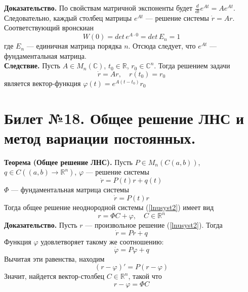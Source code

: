 \documentclass{article}
\begin{document}
\noindent \textbf{Доказательство.} По свойствам матричной экспоненты будет $\frac{d}{dt}e^{At} = Ae^{At}$. Следовательно, каждый столбец матрицы $e^{At}$ --- решение системы $\dot{r} = Ar$. Соответствующий вронскиан
\begin{equation*}
    W(0) = det\, e^{A\cdot 0} = det\, E_n = 1
\end{equation*}
где $E_n$ --- единичная матрица порядка $n$. Отсюда следует, что $e^{At}$ --- фундаментальная матрица.\\

\noindent \textbf{Следствие.} Пусть $A \in M_n(\mathbb{C})$, $t_0 \in \mathbb{R}$, $r_0 \in \mathbb{C}^n$. Тогда решением задачи
\begin{equation*}
    \dot{r} = Ar, \quad r(t_0) = r_0
\end{equation*}
является вектор-функция $\varphi(t) = e^{A(t - t_0)}r_0$

\section{Билет №18. Общее решение ЛНС и метод вариации постоянных.}
\textbf{Теорема (Общее решение ЛНС).} Пусть $P \in M_n(C(a,b))$, $q \in C((a,b) \to \mathbb{R}^n)$, $\varphi$ --- решение системы
\begin{equation}
    \dot{r} = P(t)r + q(t) \label{lnusyst2}
\end{equation}
$\Phi$ --- фундаментальная матрица системы
\begin{equation*}
    \dot{r} = P(t)r
\end{equation*}
Тогда общее решение неоднородной системы (\ref{lnusyst2}) имеет вид
\begin{equation*}
    r = \Phi C + \varphi, \quad C \in \mathbb{R}^n
\end{equation*}
\textbf{Доказательство.} Пусть $r$ --- произвольное решение (\ref{lnusyst2}). Тогда
\begin{equation*}
    \dot{r} = Pr + q
\end{equation*}
Функция $\varphi$ удовлетворяет такому же соотношению:
\begin{equation*}
    \dot{\varphi} = P\varphi + q
\end{equation*}
Вычитая эти равенства, находим
\begin{equation*}
    (r - \varphi)' = P(r - \varphi)
\end{equation*}
Значит, найдется вектор-столбец $C \in \mathbb{R}^n$, такой что
\begin{equation*}
    r - \varphi = \Phi C
\end{equation*}
\end{document}
